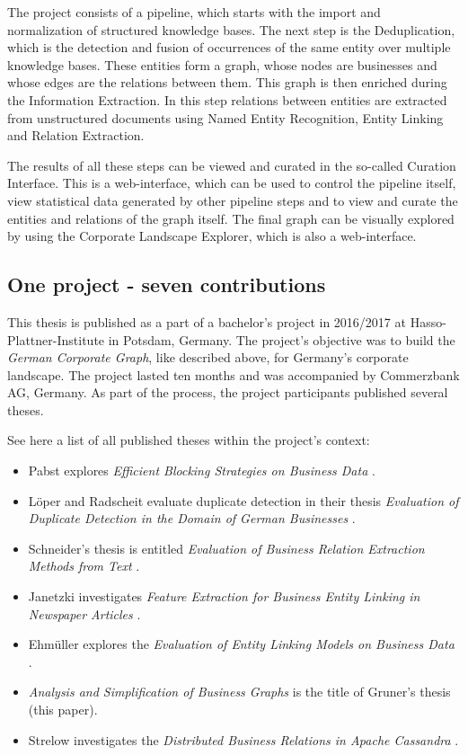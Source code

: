 \documentclass[
        a4paper,     %
        titlepage,   %
        oneside,     %
        parskip      %
]{scrartcl}          %
\begin{document}
    The project consists of a pipeline, which starts with the import and normalization of structured knowledge bases. The next step is the Deduplication, which is the detection and fusion of occurrences of the same entity over multiple knowledge bases. These entities form a graph, whose nodes are businesses and whose edges are the relations between them. This graph is then enriched during the Information Extraction. In this step relations between entities are extracted from unstructured documents using Named Entity Recognition, Entity Linking and Relation Extraction.

    The results of all these steps can be viewed and curated in the so-called Curation Interface. This is a web-interface, which can be used to control the pipeline itself, view statistical data generated by other pipeline steps and to view and curate the entities and relations of the graph itself. The final graph can be visually explored by using the Corporate Landscape Explorer, which is also a web-interface.

    \subsection{One project - seven contributions}

    This thesis is published as a part of a bachelor's project in 2016/2017 at Hasso-Plattner-Institute in Potsdam, Germany. The project's objective was to build the \emph {German Corporate Graph}, like described above, for Germany's corporate landscape. The project lasted ten months and was accompanied by Commerzbank AG, Germany. As part of the process, the project participants published several theses.

    \medskip

    See here a list of all published theses within the project's context:

    \begin{itemize}
    \item Pabst explores \emph{Efficient Blocking Strategies on Business Data} \cite{pabst}.
    \item Löper and Radscheit evaluate duplicate detection in their thesis \emph{Evaluation of Duplicate Detection in the Domain of German Businesses} \cite{loeperradscheit}.
    \item Schneider's thesis is entitled \emph{Evaluation of Business Relation Extraction Methods from Text} \cite{schneider}.
    \item Janetzki investigates \emph{Feature Extraction for Business Entity Linking in Newspaper Articles} \cite{janetzki}.
    \item Ehmüller explores the \emph{Evaluation of Entity Linking Models on Business Data} \cite{ehmueller}.
    \item \emph{Analysis and Simplification of Business Graphs} is the title of Gruner's thesis (this paper).
    \item Strelow investigates the \emph{Distributed Business Relations in Apache Cassandra} \cite{strelow}.

    \end{itemize}
\end{document}
